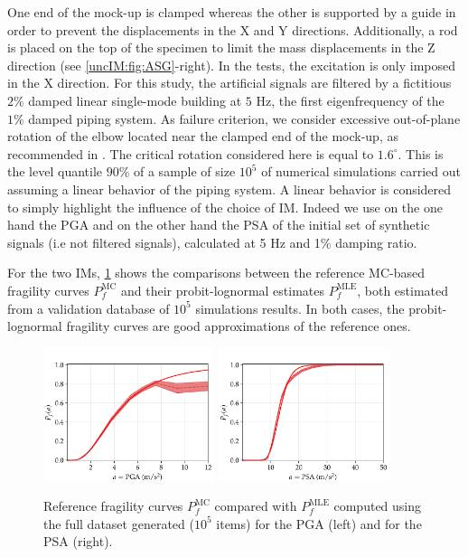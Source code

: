 One end of the mock-up is clamped whereas the other is supported by a guide in order to prevent the displacements in the X and Y directions. Additionally, a rod is  placed on the top of the specimen to limit the mass displacements in the Z direction (see \cref{uncIM:fig:ASG}-right). In the tests, the excitation is only imposed in the X direction. For this study, the artificial signals are filtered by a fictitious $2\%$ damped linear single-mode building at $5$ Hz, the first eigenfrequency of the $1\%$ damped piping system. As failure criterion, we consider excessive out-of-plane rotation of the elbow located near the clamped end of the mock-up, as recommended in \cite{touboul_enhanced_2006}. The critical rotation considered here is equal to $1.6^{\circ}$. This is the level quantile $90\%$ of a sample of size $10^5$ of numerical simulations carried out assuming a linear behavior of the piping system. A linear behavior is considered to simply highlight the influence of the choice of IM. Indeed we use on the one hand the PGA and on the other hand the PSA of the initial set of synthetic signals (i.e not filtered signals), calculated at 5 Hz and 1\% damping ratio. 

For the two IMs, \cref{uncIM:fig:ref-ASG} shows the comparisons between the reference MC-based fragility curves $P_f^{\mathrm{MC}}$ and their probit-lognormal estimates $P_f^{\mathrm{MLE}}$, both estimated from a validation database of $10^5$ simulations results. In both cases, the probit-lognormal fragility curves are good approximations of the reference ones.

\begin{figure}[!h]
    \centering
     {\includegraphics[width=5cm]{figures/uncIM/ref_ASG_PGA.pdf}}
     {\includegraphics[width=5cm]{figures/uncIM/ref_ASG_PSA.pdf}}
    \caption{Reference fragility curves $P_f^{\mathrm{MC}}$ compared with $P_f^{\mathrm{MLE}}$ computed using the full dataset generated ($10^5$ items) for the PGA (left) and for the PSA (right).%
    }
     \label{uncIM:fig:ref-ASG}
\end{figure}





